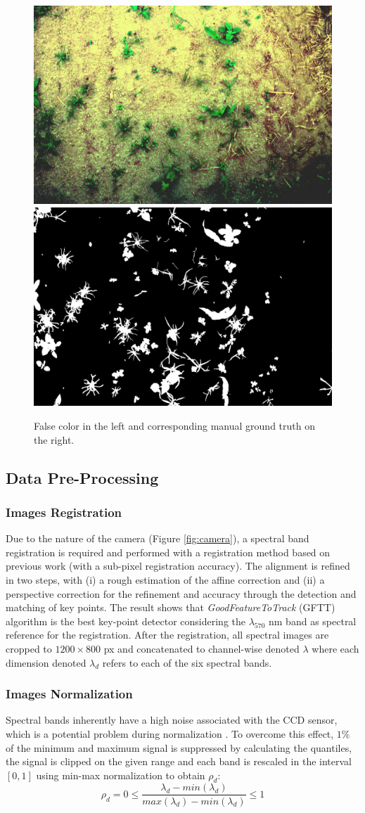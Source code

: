 \documentclass[../thesis.tex]{subfiles}
\begin{document}
	\begin{figure}[H]
		\centering
		\includegraphics[width=0.3\linewidth]{img/idx/false}
		\includegraphics[width=0.3\linewidth]{img/idx/MASK}
		\caption{False color in the left and corresponding manual ground truth on the right.}
		\label{fig:culture-adventice}
	\end{figure}
	
	
	\subsection{Data Pre-Processing}
	
	\subsubsection{Images Registration} Due to the nature of the camera (Figure \ref{fig:camera}), a spectral band registration is required and performed with a registration method based on previous work \cite{vayssade:hal-02499730} (with a sub-pixel registration accuracy). The alignment is refined in two steps, with (i) a rough estimation of the affine correction and (ii) a perspective correction for the refinement and accuracy through the detection and matching of key points. The result shows that \textit{GoodFeatureToTrack} (GFTT) algorithm is the best key-point detector considering the $\lambda_{570}$ nm band as spectral reference for the registration. After the registration, all spectral images are cropped to $1200 \times 800$ px and concatenated to channel-wise denoted $\lambda$ where each dimension denoted $\lambda_d$ refers to each of the six spectral bands.
	
	\subsubsection{Images Normalization} Spectral bands inherently have a high noise associated with the CCD sensor, which is a potential problem during normalization \cite{7989768}. To overcome this effect, $1\%$ of the minimum and maximum signal is suppressed by calculating the quantiles, the signal is clipped on the given range and each band is rescaled in the interval $[0,1]$ using min-max normalization to obtain $\rho_d$:
	\begin{equation} \rho_d = 0 \leq \frac{\lambda_d-min(\lambda_d)}{max(\lambda_d)-min(\lambda_d)} \leq 1 \end{equation}
	
\end{document}

